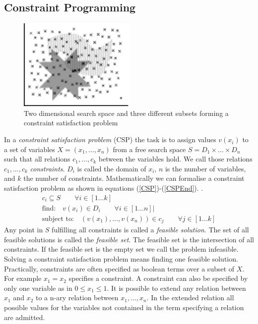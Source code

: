 \subsection{Constraint Programming}
\begin{figure}
\label{fig:CSPExample}
\includegraphics[width=0.5\textwidth]{./pics/SetIntersection.pdf}
\caption{Two dimensional search space and three different subsets forming a constraint satisfaction problem}
\end{figure}
In a \emph{constraint satisfaction problem} (CSP) the task is to assign values $v(x_i)$ to a set of variables $X = (x_1, \dots , x_n)$ from a free search space $S=D_1\times \dots \times D_n$ such that all relations $c_1,\dots,c_k$ between the variables hold. We call those relations $c_1,\dots,c_k$ \emph{constraints}. $D_i$ is called the domain of $x_i$, $n$ is the number of variables, and $k$ the number of constraints. Mathematically we can formalise a constraint satisfaction problem as shown in equations (\ref{CSP})-(\ref{CSPEnd}). \cite{Eiben97constraintsatisfaction}\cite{wiki:CSP}.
\begin{eqnarray} 
\label{CSP}
c_i \subseteq S \qquad\forall i \in \left[ 1 \dots k \right]\\
\text{find:} \quad v(x_i) \in D_i \qquad\forall i \in \left[ 1 \dots n \right]| \\
\label{CSPEnd}
\text{subject to:} \quad (v(x_1),\dots , v(x_n)) \in c_j\qquad\forall j \in \left[1 \dots k\right]
\end{eqnarray} 
Any point in $S$ fulfilling all constraints is called a \emph{feasible solution}. The set of all feasible solutions is called the \emph{feasible set}. The feasible set is the intersection of all constraints. If the feasible set is the empty set we call the problem infeasible. Solving a constraint satisfaction problem means finding one feasible solution.\\
Practically, constraints are often specified as boolean terms over a subset of $X$. For example $x_1=x_2$ specifies a constraint. A constraint can also be specified by only one variable as in $0\leq x_1 \leq 1$. It is possible to extend any relation between $x_1$ and $x_2$ to a n-ary relation between $x_1,\dots,x_n$. In the extended relation all possible values for the variables not contained in the term specifying a relation are admitted.\\
